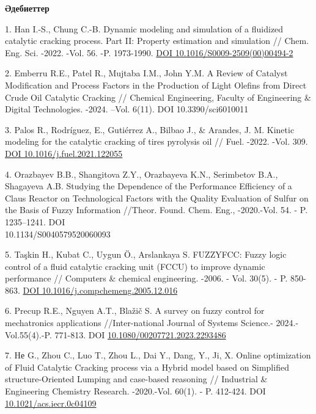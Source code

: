 \begin{center}
{\bfseries Әдебиеттер}
\end{center}

\begin{references}

1. Han I.-S., Chung C.-B. Dynamic modeling and simulation of a fluidized
catalytic cracking process. Part II: Property estimation and
simulation // Chem. Eng. Sci. -2022. -Vol. 56. -P. 1973-1990.
\href{https://doi.org/10.1016/S0009-2509(00)00494-2}{DOI
10.1016/S0009-2509(00)00494-2}

2. Emberru R.E., Patel R., Mujtaba I.M., John Y.M. A Review of Catalyst
Modification and Process Factors in the Production of Light Olefins
from Direct Crude Oil Catalytic Cracking // Chemical Engineering,
Faculty of Engineering \& Digital Technologies. -2024. --Vol. 6(11).
DOI 10.3390/sci6010011

3. Palos R., Rodríguez, E., Gutiérrez A., Bilbao J., \& Arandes, J. M.
Kinetic modeling for the catalytic cracking of tires pyrolysis oil //
Fuel. -2022. -Vol. 309.
\href{https://doi.org/10.1016/j.fuel.2021.122055}{DOI
10.1016/j.fuel.2021.122055}

4. Orazbayev B.B., Shangitova Z.Y., Orazbayeva K.N., Serimbetov B.A.,
Shagayeva A.B. Studying the Dependence of the Performance Efficiency
of a Claus Reactor on Technological Factors with the Quality
Evaluation of Sulfur on the Basis of Fuzzy Information //Theor. Found.
Chem. Eng., -2020.-Vol. 54. - P. 1235--1241. DOI
\\10.1134/S0040579520060093

5. Taşkin H., Kubat C., Uygun Ö., Arslankaya S. FUZZYFCC: Fuzzy logic
control of a fluid catalytic cracking unit (FCCU) to improve dynamic
performance // Computers \& chemical engineering. -2006. - Vol. 30(5).
- P. 850-863. \href{https://doi.org/10.1016/j.compchemeng.2005.12.016}{DOI
10.1016/j.compchemeng.2005.12.016}

6. Precup R.E., Nguyen A.T., Blažič S. A survey on fuzzy control for
mechatronics applications //Inter-national Journal of Systems Science.-
2024.- Vol.55(4).-P. 771-813. DOI \href{https://doi.org/10.1080/00207721.2023.2293486}{10.1080/00207721.2023.2293486}


7. Hе G., Zhou C., Luo T., Zhou L., Dai Y., Dang, Y., Ji, X. Online
optimization of Fluid Catalytic Cracking process via a Hybrid model
based on Simplified structure-Oriented Lumping and case-based
reasoning // Industrial \& Engineering Chemistry Research. -2020.-Vol.
60(1). - P. 412-424. DOI
\\\href{http://dx.doi.org/10.1021/acs.iecr.0c04109}{10.1021/acs.iecr.0c04109}


\end{references}
